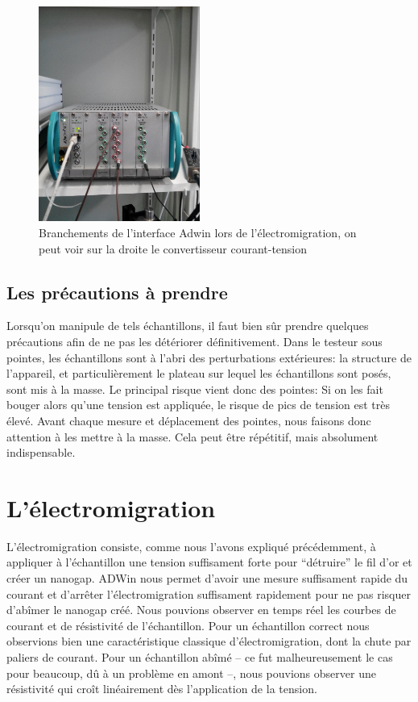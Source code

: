 \begin{figure}[h]
    \begin{center}
        \includegraphics[trim=0mm 0mm 80px 600px, clip, width=200px]{Photos/Branchements_ADWin.jpg}
        \caption{Branchements de l'interface Adwin lors de l'électromigration, on peut voir sur la droite le convertisseur courant-tension}
        \label{fig:}
    \end{center}
\end{figure}


\subsection{Les précautions à prendre}
Lorsqu'on manipule de tels échantillons, il faut bien sûr prendre quelques précautions afin de ne pas les détériorer définitivement.
Dans le testeur sous pointes, les échantillons sont à l'abri des perturbations extérieures: la structure de l'appareil, et particulièrement le plateau sur lequel les échantillons sont posés, sont mis à la masse.
Le principal risque vient donc des pointes: Si on les fait bouger alors qu'une tension est appliquée, le risque de pics de tension est très élevé. Avant chaque mesure et déplacement des pointes, nous faisons donc attention à les mettre à la masse. Cela peut être répétitif, mais absolument indispensable. 

\section{L'électromigration}
L'électromigration consiste, comme nous l'avons expliqué précédemment, à appliquer à l'échantillon une tension suffisament forte pour “détruire” le fil d'or et créer un nanogap.
ADWin nous permet d'avoir une mesure suffisament rapide du courant et d'arrêter l'électromigration suffisament rapidement pour ne pas risquer d'abîmer le nanogap créé.
Nous pouvions observer en temps réel les courbes de courant et de résistivité de l'échantillon. Pour un échantillon correct nous observions bien une caractéristique classique d'électromigration, dont la chute par paliers de courant.
Pour un échantillon abîmé -- ce fut malheureusement le cas pour beaucoup, dû à un problème en amont --, nous pouvions observer une résistivité qui croît linéairement dès l'application de la tension.

